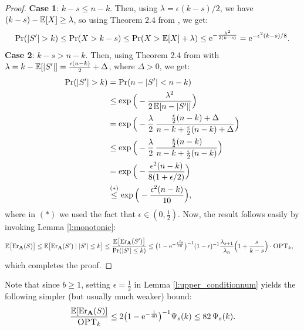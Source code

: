 \documentclass{article}
\begin{document}
\begin{proof}
\textbf{Case 1}: $k-s\leq n-k$. Then, using $\lambda=\epsilon(k-s)/2$,
we have $(k-s)-\mathbb E[X]\geq \lambda$, so using Theorem 2.4
from \citet{ChungLu2006book}, we get:
\begin{align*}
  \Pr(|S'|>k)\leq \Pr(X>k-s)\leq \Pr(X>\E[X]+\lambda)\leq
  \ee^{-\frac{\lambda^2}{2(k-s)}}
  =\ee^{-\epsilon^2(k-s)/8}.
\end{align*}
\textbf{Case 2}: $k-s>n-k$. Then, using Theorem 2.4
from \citet{ChungLu2006book} with $\lambda=k-\mathbb E[|S'|]=\frac{\epsilon(n-k)}2
+ \Delta$, where $\Delta>0$, we get:
\begin{align*}
  \Pr(|S'|>k)
  &= \Pr(n-|S'|<n-k)\\
 &\leq \exp\Big(-\frac{\lambda^2}{2\,\E[n-|S'|]}\Big) \\
  &=\exp\Big(-\frac\lambda2\,\frac{\frac\epsilon2(n-k)
    + \Delta}{n-k+\frac\epsilon2(n-k)+\Delta}\Big)\\
  &\leq\exp\Big(-\frac\lambda2\,\frac{\frac\epsilon2(n-k)}
    {n-k+\frac\epsilon2(n-k)}\Big)\\
  &=\exp\Big(-\frac{\epsilon^2(n-k)}{8(1+\epsilon/2)}\Big)\\
  &\overset{(*)}{\leq} \exp\Big(-\frac{\epsilon^2(n-k)}{10}\Big),
\end{align*}
where in $(*)$ we used the fact that $\epsilon\in(0,\frac12)$. Now,
the result follows easily by invoking Lemma \ref{l:monotonic}:
\begin{align*}
    \mathbb E\big[\mathrm{Er}_\mathbf A(S)\big] &\leq \mathbb E\big[\mathrm{Er}_\mathbf A(S')\mid|S'|\leq k\big]
  \leq \frac{\mathbb E\big[\mathrm{Er}_\mathbf A(S')\big]}{\mathrm{Pr}(|S'|\leq k)}
  \leq \big(1-\mathrm{e}^{-\frac{\epsilon^2b}{10}}\big)^{-1}(1-\epsilon)^{-1}
\frac{\lambda_{s+1}}{\lambda_n}\Big(1+\frac s{k-s}\Big)\cdot{\textsc{OPT}_k},
\end{align*}
which completes the proof.
\end{proof}
Note that since $b\geq 1$, setting $\epsilon=\frac12$ in Lemma
\ref{l:upper_conditionnum} yields the following simpler (but usually
much weaker) bound:
\begin{align*}
  \frac{\mathbb E[\mathrm{Er}_\mathbf A(S)]}{{\textsc{OPT}_k}}
  \leq
  2\big(1-\mathrm{e}^{-\frac1{40}}\big)^{-1}\Psi_s(k)
  \leq 82\, \Psi_s(k).
\end{align*}
\end{document}
